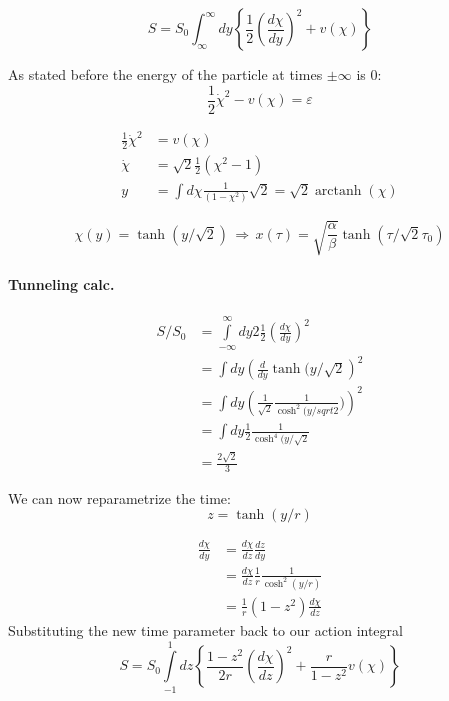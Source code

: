 \documentclass[12pt,a4paper]{article}
\DeclareMathOperator\arctanh{arctanh}
\numberwithin{equation}{section}
\begin{document}
\begin{equation}
S = S_0 \int_{\infty}^\infty dy\left\lbrace \frac{1}{2}\left( \frac{d\chi}{dy}\right)^2 + v(\chi)\right\rbrace
\end{equation}


As stated before the energy of the particle at times $\pm \infty$ is 0:
\begin{equation}
\frac{1}{2}\dot{\chi}^2 - v(\chi) = \varepsilon
\end{equation}


\begin{align}
\frac{1}{2}\dot{\chi}^2 &= v(\chi) \\
\dot{\chi} &= \sqrt{2} \frac{1}{2} (\chi^2 -1 )\\
y &= \int d\chi \frac{1}{(1-\chi^2)}\sqrt{2} = \sqrt{2} \arctanh(\chi)
\end{align}

\begin{equation}\label{clpath}
\chi(y) = \tanh(y/\sqrt{2}) \, \Rightarrow \, x(\tau) = \sqrt{\frac{\alpha}{\beta}} \tanh(\tau/\sqrt{2}\tau_0)
\end{equation}

\paragraph{Tunneling calc.}
\begin{align}
S/S_0 &= \int\limits_{-\infty}^\infty dy 2 \frac{1}{2} \left(  \frac{d\chi}{dy} \right)^2  \\
&= \int dy \left( \frac{d}{dy} \tanh(y/\sqrt{2} \right)^2\\
&= \int dy \left(\frac{1}{\sqrt{2}} \frac{1}{\cosh^2(y/sqrt{2}}) \right)^2 \\
&= \int dy \frac{1}{2} \frac{1}{\cosh^4 (y/\sqrt{2}} \\
&= \frac{2 \sqrt{2}}{3}
\end{align}


We can now reparametrize the time:
\begin{equation}
z = \tanh(y/r) 
\end{equation}


\begin{align}
\frac{d\chi}{dy} &= \frac{d\chi}{dz} \frac{dz}{dy} \\
&= \frac{d\chi}{dz} \frac{1}{r} \frac{1}{\cosh^2(y/r)}\\
&= \frac{1}{r} (1-z^2) \frac{d\chi}{dz}
\end{align}
Substituting the new time parameter back to our action integral
\begin{equation}
S = S_0 \int\limits_{-1}^1 dz \left\lbrace \frac{1-z^2}{2r} \left( \frac{d\chi}{dz}\right)^2 + \frac{r}{1-z^2} v(\chi) \right\rbrace
\end{equation}
\end{document}
